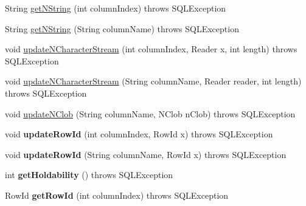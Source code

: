 \begin{DoxyCompactItemize}
\item 
String \mbox{\hyperlink{classcom_1_1mysql_1_1jdbc_1_1_j_d_b_c4_result_set_ab4ab66899e61b969bab44eccedad00fb}{get\+N\+String}} (int column\+Index)  throws S\+Q\+L\+Exception 
\item 
String \mbox{\hyperlink{classcom_1_1mysql_1_1jdbc_1_1_j_d_b_c4_result_set_a01c74243228097fa36990664acb399bd}{get\+N\+String}} (String column\+Name)  throws S\+Q\+L\+Exception 
\item 
void \mbox{\hyperlink{classcom_1_1mysql_1_1jdbc_1_1_j_d_b_c4_result_set_a5d72c53312683748786c1416e5e14bf5}{update\+N\+Character\+Stream}} (int column\+Index, Reader x, int length)  throws S\+Q\+L\+Exception 
\item 
void \mbox{\hyperlink{classcom_1_1mysql_1_1jdbc_1_1_j_d_b_c4_result_set_a641a93c720890dce9260033269fa9611}{update\+N\+Character\+Stream}} (String column\+Name, Reader reader, int length)  throws S\+Q\+L\+Exception 
\item 
void \mbox{\hyperlink{classcom_1_1mysql_1_1jdbc_1_1_j_d_b_c4_result_set_ab7a86653c16281ed187fdda84743d6d3}{update\+N\+Clob}} (String column\+Name, N\+Clob n\+Clob)  throws S\+Q\+L\+Exception 
\item 
\mbox{\label{classcom_1_1mysql_1_1jdbc_1_1_j_d_b_c4_result_set_a2984faca8923fa1a5eaff36e05097d17}} 
void {\bfseries update\+Row\+Id} (int column\+Index, Row\+Id x)  throws S\+Q\+L\+Exception 
\item 
\mbox{\label{classcom_1_1mysql_1_1jdbc_1_1_j_d_b_c4_result_set_a2d9a02a4dcc808388b4a67a2e987191f}} 
void {\bfseries update\+Row\+Id} (String column\+Name, Row\+Id x)  throws S\+Q\+L\+Exception 
\item 
\mbox{\label{classcom_1_1mysql_1_1jdbc_1_1_j_d_b_c4_result_set_a4b25d7d39fb8c0225f056b3d25cb883c}} 
int {\bfseries get\+Holdability} ()  throws S\+Q\+L\+Exception 
\item 
\mbox{\label{classcom_1_1mysql_1_1jdbc_1_1_j_d_b_c4_result_set_a8f8d6a4cfc67604eb35e68a2a566e218}} 
Row\+Id {\bfseries get\+Row\+Id} (int column\+Index)  throws S\+Q\+L\+Exception 
\item 
\mbox{\label{classcom_1_1mysql_1_1jdbc_1_1_j_d_b_c4_result_set_a5aed9f8331b1fdd326937df807c8ce94}} 

\end{DoxyCompactItemize}
